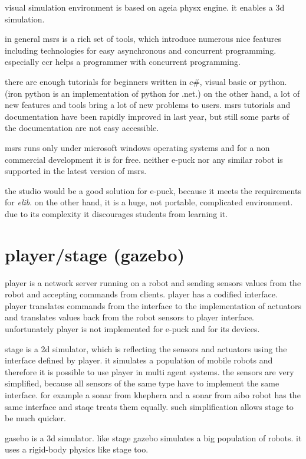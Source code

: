   visual simulation environment is based on ageia physx engine. it enables a 3d simulation.
  
  in general msrs is a rich set of tools, which introduce numerous nice features including
  technologies for easy asynchronous and concurrent programming. especially ccr helps
  a programmer with concurrent programming. 
  
  there are enough tutorials for beginners written
  in $c\#$, visual basic or python. (iron python is an implementation of python for .net.)
  on the other hand, a lot of new features and tools bring a lot of new problems to users.
  msrs tutorials and documentation have been rapidly improved in last year, but still some parts
  of the documentation are not easy accessible.
  
  msrs runs only under microsoft windows operating systems and for a non commercial development
  it is for free. neither e-puck nor any similar robot is supported in the latest version of msrs.
  
  the studio would be a good solution for e-puck, because it meets the requirements for {\it elib}.
  on the other hand, it is a huge, not portable, complicated environment.
  due to its complexity it discourages students from learning it.
\section{player/stage (gazebo) \cite{player}}
  player is a network server running on a robot and sending sensors values from the robot and
  accepting commands from clients. player has a codified interface. player translates
  commands from the interface to the implementation of actuators and translates values back from the robot sensors 
  to player interface. unfortunately player is not implemented for e-puck
  and for its devices.
  
  stage is a 2d simulator, which is reflecting the sensors and actuators using the interface defined by player.
  it simulates a population of mobile robots and therefore it is possible to use player 
  in multi agent systems.
  the sensors are very simplified, because all sensors of the same type 
  have to implement the same interface. for example a sonar from khephera and a sonar from aibo robot
  has the same interface and staqe treats them equally. 
  such simplification allows stage to be much quicker.
  
  gasebo is a 3d simulator. like stage gazebo simulates a big population of robots.
  it uses a rigid-body physics like stage too.
  
